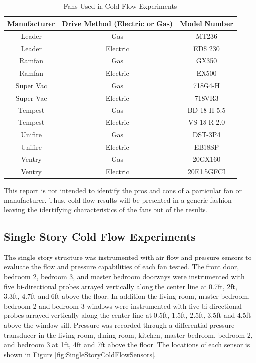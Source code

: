 \documentclass{article}
\begin{document}
\begin{table}[H]
	\centering
	\caption{Fans Used in Cold Flow Experiments}
	\begin{tabular}{|c|c|c|}
		\hline
		Manufacturer & Drive Method (Electric or Gas) & Model Number \\ \hline \hline
		Leader & Gas & MT236 \\ \hline
		Leader & Electric & EDS 230 \\ \hline
		Ramfan & Gas & GX350 \\ \hline
		Ramfan & Electric & EX500 \\ \hline
		Super Vac & Gas & 718G4-H \\ \hline
		Super Vac & Electric & 718VR3 \\ \hline
		Tempest & Gas & BD-18-H-5.5 \\ \hline
		Tempest & Electric & VS-18-R-2.0 \\ \hline
		Unifire & Gas & DST-3P4 \\ \hline
		Unifire & Electric & EB18SP \\ \hline
		Ventry & Gas & 20GX160 \\ \hline
		Ventry & Electric & 20E1.5GFCI \\ \hline
	\end{tabular}
	\label{table:cold_flow_Fans}
\end{table}

This report is not intended to identify the pros and cons of a particular fan or manufacturer. Thus, cold flow results will be presented in a generic fashion leaving the identifying characteristics of the fans out of the results. 

\subsection{Single Story Cold Flow Experiments}
The single story structure was instrumented with air flow and pressure sensors to evaluate the flow and pressure capabilities of each fan tested. The front door, bedroom 2, bedroom 3, and master bedroom doorways were instrumented with five bi-directional probes arrayed vertically along the center line at 0.7ft, 2ft, 3.3ft, 4.7ft and 6ft above the floor. In addition the living room, master bedroom, bedroom 2 and bedroom 3 windows were instrumented with five bi-directional probes arrayed vertically along the center line at 0.5ft, 1.5ft, 2.5ft, 3.5ft and 4.5ft above the window sill. Pressure was recorded through a differential pressure transducer in the living room, dining room, kitchen, master bedroom, bedroom 2, and bedroom 3 at 1ft, 4ft and 7ft above the floor. The locations of each sensor is shown in Figure \ref{fig:SingleStoryColdFlowSensors}. 
\end{document}
